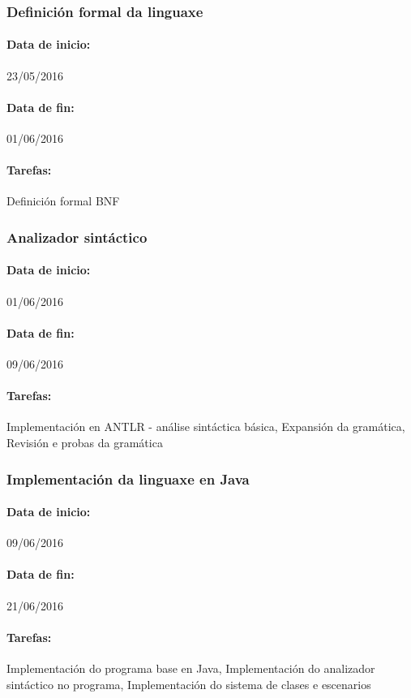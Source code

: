 \subsubsection{Definición formal da linguaxe}
\paragraph{Data de inicio:} 23/05/2016
\paragraph{Data de fin:} 01/06/2016
\paragraph{Tarefas:} Definición formal BNF

\subsubsection{Analizador sintáctico}
\paragraph{Data de inicio:} 01/06/2016
\paragraph{Data de fin:} 09/06/2016
\paragraph{Tarefas:} Implementación en ANTLR - análise sintáctica básica,
Expansión da gramática, Revisión e probas da gramática

\subsubsection{Implementación da linguaxe en Java}
\paragraph{Data de inicio:} 09/06/2016
\paragraph{Data de fin:} 21/06/2016
\paragraph{Tarefas:} Implementación do programa base en Java, Implementación do
analizador sintáctico no programa, Implementación do sistema de clases e
escenarios

